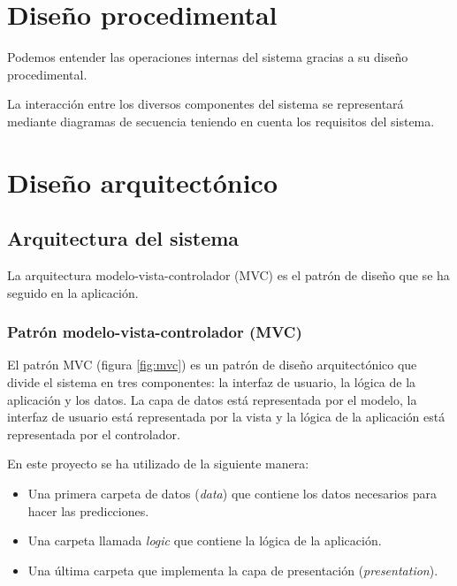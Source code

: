 \section{Diseño procedimental}

Podemos entender las operaciones internas del sistema gracias a su diseño procedimental.

La interacción entre los diversos componentes del sistema se representará mediante diagramas de secuencia teniendo en cuenta los requisitos del sistema.


\section{Diseño arquitectónico}

\subsection{Arquitectura del sistema}

La arquitectura modelo-vista-controlador (MVC) es el patrón de diseño que se ha seguido en la aplicación.

\subsubsection{Patrón modelo-vista-controlador (MVC)}

El patrón MVC (figura \ref{fig:mvc}) es un patrón de diseño arquitectónico que divide el sistema en tres componentes: la interfaz de usuario, la lógica de la aplicación y los datos. La capa de datos está representada por el modelo, la interfaz de usuario está representada por la vista y la lógica de la aplicación está representada por el controlador.


En este proyecto se ha utilizado de la siguiente manera:
\begin{itemize}
    \item Una primera carpeta de datos (\textit{data}) que contiene los datos necesarios para hacer las predicciones.
    \item Una carpeta llamada \textit{logic} que contiene la lógica de la aplicación.
    \item Una última carpeta que implementa la capa de presentación (\textit{presentation}).
\end{itemize}

